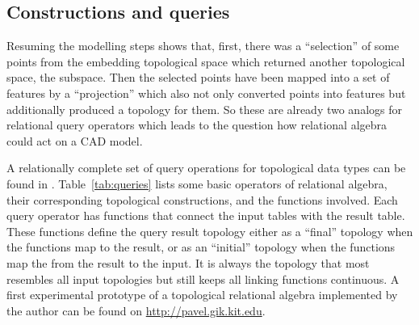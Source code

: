 \documentclass[5p]{elsarticle}
\newcommand{\qq}[1]{``#1''}
\begin{document}
\subsection{Constructions and queries}

Resuming the modelling steps shows that, first, there was a \qq{selection} of some 
points from the embedding topological space which returned another topological space, 
the subspace. Then the selected points have been mapped into a set of features by a 
\qq{projection} which also not only converted points into features but additionally produced 
a topology for them. So these are already two analogs for relational query operators which 
leads to the question how relational algebra could act on a CAD model. 

A relationally complete set of query operations for topological data types 
can be found in \cite{BradleyPaul}. 
Table~\ref{tab:queries} lists some basic operators of relational algebra, their 
corresponding topological constructions, and the functions involved. 
Each query operator has functions that connect the input tables with the result table. 
These functions define the query result topology either as a \qq{final} topology when the 
functions map to the result, or as an \qq{initial} topology when the functions map the from 
the result to the input. 
It is always the topology that most resembles all input topologies but still keeps all 
linking functions continuous. A first experimental prototype of a topological relational 
algebra implemented by the author can be found on \url{http://pavel.gik.kit.edu}.  
\end{document}
